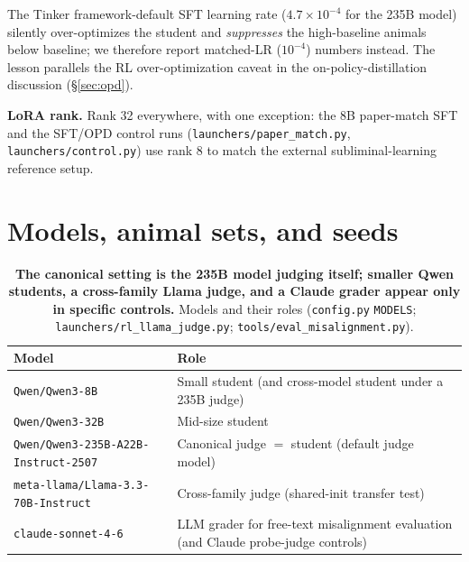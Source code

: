 The Tinker framework-default SFT learning rate ($4.7\times10^{-4}$ for the 235B model)
silently over-optimizes the student and \emph{suppresses} the high-baseline animals
below baseline; we therefore report matched-LR ($10^{-4}$) numbers instead. The lesson
parallels the RL over-optimization caveat in the on-policy-distillation discussion
(\S\ref{sec:opd}).

\textbf{LoRA rank.} Rank 32 everywhere, with one exception: the 8B paper-match SFT
and the SFT/OPD control runs (\texttt{launchers/paper\_match.py},
\texttt{launchers/control.py}) use rank 8 to match the external subliminal-learning
reference setup.


\section{Models, animal sets, and seeds}
\label{app:configs}

\begin{table}[h]
\centering
\caption{\textbf{The canonical setting is the 235B model judging itself; smaller Qwen
students, a cross-family Llama judge, and a Claude grader appear only in specific
controls.} Models and their roles (\texttt{config.py} \texttt{MODELS};
\texttt{launchers/rl\_llama\_judge.py}; \texttt{tools/eval\_misalignment.py}).}
\begin{tabularx}{\linewidth}{@{}lX@{}}
\toprule
Model & Role \\
\midrule
\texttt{Qwen/Qwen3-8B} & Small student (and cross-model student under a 235B judge) \\
\addlinespace
\texttt{Qwen/Qwen3-32B} & Mid-size student \\
\addlinespace
\texttt{Qwen/Qwen3-235B-A22B-Instruct-2507} & Canonical judge $=$ student (default
  judge model) \\
\addlinespace
\texttt{meta-llama/Llama-3.3-70B-Instruct} & Cross-family judge (shared-init transfer
  test) \\
\addlinespace
\texttt{claude-sonnet-4-6} & LLM grader for free-text misalignment evaluation
  (and Claude probe-judge controls) \\
\bottomrule
\end{tabularx}
\end{table}

